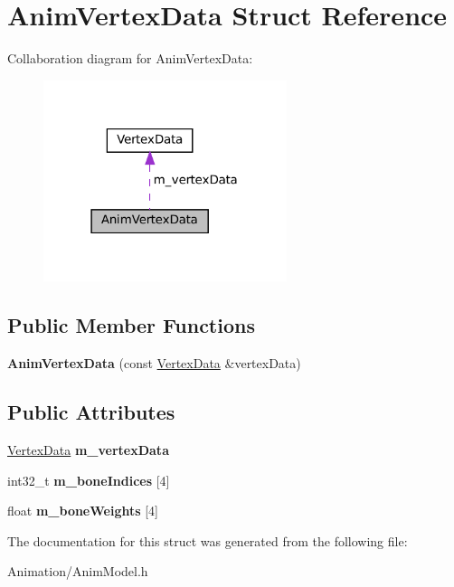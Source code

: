 \hypertarget{structAnimVertexData}{}\section{Anim\+Vertex\+Data Struct Reference}
\label{structAnimVertexData}


Collaboration diagram for Anim\+Vertex\+Data\+:\nopagebreak
\begin{figure}[H]
\begin{center}
\leavevmode
\includegraphics[width=202pt]{structAnimVertexData__coll__graph}
\end{center}
\end{figure}
\subsection*{Public Member Functions}
\begin{DoxyCompactItemize}
\item 
\mbox{\label{structAnimVertexData_a1e40cc145ac05a4592808aacf386dac9}} 
{\bfseries Anim\+Vertex\+Data} (const \hyperlink{structVertexData}{Vertex\+Data} \&vertex\+Data)
\end{DoxyCompactItemize}
\subsection*{Public Attributes}
\begin{DoxyCompactItemize}
\item 
\mbox{\label{structAnimVertexData_a128ebc399fe151b2581260866b4be3fd}} 
\hyperlink{structVertexData}{Vertex\+Data} {\bfseries m\+\_\+vertex\+Data}
\item 
\mbox{\label{structAnimVertexData_af3182e3c64d06876913bc91e5ddc24ff}} 
int32\+\_\+t {\bfseries m\+\_\+bone\+Indices} \mbox{[}4\mbox{]}
\item 
\mbox{\label{structAnimVertexData_a2eebb4c79533a02a0cf9c4c2f50e1b2e}} 
float {\bfseries m\+\_\+bone\+Weights} \mbox{[}4\mbox{]}
\end{DoxyCompactItemize}


The documentation for this struct was generated from the following file\+:\begin{DoxyCompactItemize}
\item 
Animation/Anim\+Model.\+h\end{DoxyCompactItemize}
